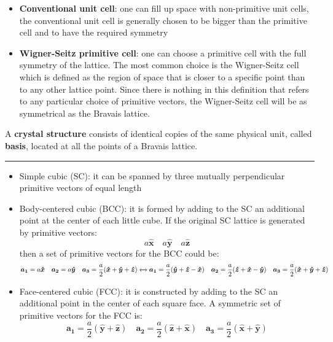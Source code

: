 \documentclass[10.75pt,a4paper,openright,bottom=2cm]{article}
\renewcommand{\Vec}[1]{\boldsymbol{#1}}
\begin{document}
\begin{itemize}
    \item \textbf{Conventional unit cell}: one can fill up space with non-primitive unit cells, the conventional unit cell is generally chosen to be bigger than the primitive cell and to have the required symmetry
    \item \textbf{Wigner-Seitz primitive cell}: one can choose a primitive cell with the full symmetry of the lattice. The most common choice is the Wigner-Seitz cell which is defined as the region of space that is closer to a specific point than to any other lattice point. Since there is nothing in this definition that refers to any particular choice of primitive vectors, the Wigner-Seitz cell will be as symmetrical as the Bravais lattice. 
\end{itemize}
A \textbf{crystal structure} consists of identical copies of the same physical unit, called \textbf{basis}, located at all the points of a Bravais lattice. 
\hrule
\begin{itemize}
    \item Simple cubic (SC): it can be spanned by three mutually perpendicular primitive vectors of equal length
    \item Body-centered cubic (BCC): it is formed by adding to the SC an additional point at the center of each little cube. If the original SC lattice is generated by primitive vectors:
    \[
    a\Vec{\hat{x}} \quad a\Vec{\hat{y}} \quad a\Vec{\hat{z}}
    \]
    then a set of primitive vectors for the BCC could be:
    \[
    \Vec{a_1}=a\Vec{\hat{x}} \quad \Vec{a_2}=a\Vec{\hat{y}} \quad \Vec{a_3}=\frac{a}{2}(\Vec{\hat{x}}+\Vec{\hat{y}}+\Vec{\hat{z}})
    \xleftrightarrow[]{}
    \Vec{a_1}=\frac{a}{2}(\Vec{\hat{y}}+\Vec{\hat{z}}-\Vec{\hat{x}}) \quad \Vec{a_2}=\frac{a}{2}(\Vec{\hat{z}}+\Vec{\hat{x}}-\Vec{\hat{y}}) \quad \Vec{a_3}=\frac{a}{2}(\Vec{\hat{x}}+\Vec{\hat{y}}+\Vec{\hat{z}})
    \]
    \item Face-centered cubic (FCC): it is constructed by adding to the SC an additional point in the center of each square face. A symmetric set of primitive vectors for the FCC is:
    \[
    \Vec{a_1}=\frac{a}{2}(\Vec{\hat{y}}+\Vec{\hat{z}}) \quad \Vec{a_2}=\frac{a}{2}(\Vec{\hat{z}}+\Vec{\hat{x}}) \quad \Vec{a_3}=\frac{a}{2}(\Vec{\hat{x}}+\Vec{\hat{y}})
    \]
\end{itemize}
\end{document}
